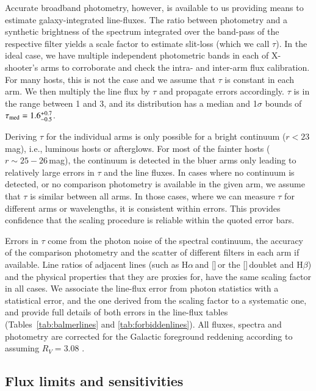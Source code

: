 \documentclass[traditabstract, longauth]{aa}
\newcommand{\hb}{H$\beta$}
\newcommand{\ha}{H$\alpha$}
\newcommand{\oiii}{[\ion{O}{iii}]}
\newcommand{\nii}{[\ion{N}{ii}]}
\begin{document}
Accurate broadband photometry, however, is available to us providing means to estimate galaxy-integrated line-fluxes. The ratio between photometry and a synthetic brightness of the spectrum integrated over the band-pass of the respective filter yields a scale factor to estimate slit-loss (which we call $\tau$). In the ideal case, we have multiple independent photometric bands in each of X-shooter's arms to corroborate and check the intra- and inter-arm flux calibration. For many hosts, this is not the case and we assume that $\tau$ is constant in each arm. We then multiply the line flux by $\tau$ and propagate errors accordingly. $\tau$ is in the range between 1 and 3, and its distribution has a median and 1$\sigma$ bounds of $\tau_{\rm {med}} = 1.6_{-0.5}^{+0.7}$. 

Deriving $\tau$ for the individual arms is only possible for a bright continuum ($r<23$\,mag), i.e., luminous hosts or afterglows. For most of the fainter hosts ($r\sim25-26$\,mag), the continuum is detected in the bluer arms only leading to relatively large errors in $\tau$ and the line fluxes. In cases where no continuum is detected, or no comparison photometry is available in the given arm, we assume that $\tau$ is similar between all arms. In those cases, where we can measure $\tau$ for different arms or wavelengths, it is consistent within errors. This provides confidence that the scaling procedure is reliable within the quoted error bars.

Errors in $\tau$ come from the photon noise of the spectral continuum, the accuracy of the comparison photometry and the scatter of different filters in each arm if available. Line ratios of adjacent lines (such as \ha\,and \nii\,or the \oiii\,doublet and \hb) and the physical properties that they are proxies for, have the same scaling factor in all cases. We associate the line-flux error from photon statistics with a statistical error, and the one derived from the scaling factor to a systematic one, and provide full details of both errors in the line-flux tables (Tables~\ref{tab:balmerlines} and \ref{tab:forbiddenlines}). All fluxes, spectra and photometry are corrected for the Galactic foreground reddening according to \citet{2011ApJ...737..103S} assuming $R_V=3.08$ \citep{1992ApJ...395..130P}.


\subsection{Flux limits and sensitivities}
\label{sec:sens}
\end{document}
